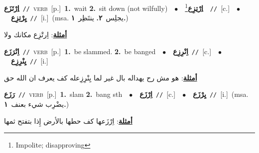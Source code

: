 \documentclass[10pt,a4paper,twoside]{article} %
\begin{document}
\begin{multicols}{2}
{\setlength\topsep{0pt}\textbf{\foreignlanguage{arabic}{اِرْتَزَع}}\ {\color{gray}\texttt{//}\color{black}}\ \textsc{verb}\ [p.]\ \textbf{1.}~wait  \textbf{2.}~sit down (not wilfully)\ \ $\bullet$\ \ \setlength\topsep{0pt}\textbf{\foreignlanguage{arabic}{اِرْتِزِع}}\footnote{Impolite; disapproving}\ \ {\color{gray}\texttt{//}\color{black}}\ [c.]\ \ $\bullet$\ \ \setlength\topsep{0pt}\textbf{\foreignlanguage{arabic}{يِرْتِزِع}}\ {\color{gray}\texttt{//}\color{black}}\ [i.]\ \color{gray}(msa. \foreignlanguage{arabic}{يجلِس}~\foreignlanguage{arabic}{\textbf{٢.}}  \foreignlanguage{arabic}{ينتَظِر}~\foreignlanguage{arabic}{\textbf{١.}})\color{black}\  \begin{flushright}\color{gray}\foreignlanguage{arabic}{\textbf{\underline{\foreignlanguage{arabic}{أمثلة}}}: اِرتْزِع مكانك ولا}\end{flushright}\color{black}} \vspace{2mm}

{\setlength\topsep{0pt}\textbf{\foreignlanguage{arabic}{اِنْرَزَع}}\ {\color{gray}\texttt{//}\color{black}}\ \textsc{verb}\ [p.]\ \textbf{1.}~be slammed.  \textbf{2.}~be banged\ \ $\bullet$\ \ \setlength\topsep{0pt}\textbf{\foreignlanguage{arabic}{اِنْرِزِع}}\ {\color{gray}\texttt{//}\color{black}}\ [c.]\ \ $\bullet$\ \ \setlength\topsep{0pt}\textbf{\foreignlanguage{arabic}{يِنْرِزِع}}\ {\color{gray}\texttt{//}\color{black}}\ [i.]\  \begin{flushright}\color{gray}\foreignlanguage{arabic}{\textbf{\underline{\foreignlanguage{arabic}{أمثلة}}}: هو مش رح يهداله بال غير لما يِنْرِزِعله كف يعرف ان الله حق}\end{flushright}\color{black}} \vspace{2mm}

{\setlength\topsep{0pt}\textbf{\foreignlanguage{arabic}{رَزَع}}\ {\color{gray}\texttt{//}\color{black}}\ \textsc{verb}\ [p.]\ \textbf{1.}~slam  \textbf{2.}~bang sth\ \ $\bullet$\ \ \setlength\topsep{0pt}\textbf{\foreignlanguage{arabic}{اِرْزَع}}\ {\color{gray}\texttt{//}\color{black}}\ [c.]\ \ $\bullet$\ \ \setlength\topsep{0pt}\textbf{\foreignlanguage{arabic}{يِرْزَع}}\ {\color{gray}\texttt{//}\color{black}}\ [i.]\ \color{gray}(msa. \foreignlanguage{arabic}{يضْرِب شيء بعنف}~\foreignlanguage{arabic}{\textbf{١.}})\color{black}\  \begin{flushright}\color{gray}\foreignlanguage{arabic}{\textbf{\underline{\foreignlanguage{arabic}{أمثلة}}}: اِرْزَعها كف حطها بالأرض إِذا بتفتح ثمها}\end{flushright}\color{black}} \vspace{2mm}


\end{multicols}
\end{document}
